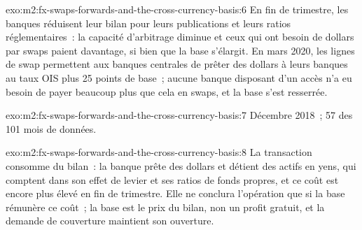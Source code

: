\begin{solution}{exo:m2:fx-swaps-forwards-and-the-cross-currency-basis:6}
En fin de trimestre, les banques réduisent leur bilan pour leurs publications et
leurs ratios réglementaires~: la capacité d'arbitrage diminue et ceux qui ont besoin
de dollars par swaps paient davantage, si bien que la base s'élargit. En mars 2020, les lignes de swap permettent aux banques centrales
de prêter des dollars à leurs banques au taux OIS plus 25 points de base~; aucune banque disposant
d'un accès n'a eu besoin de payer beaucoup plus que cela en swaps, et la base s'est resserrée.
\end{solution}

\begin{solution}{exo:m2:fx-swaps-forwards-and-the-cross-currency-basis:7}
Décembre 2018~; 57 des 101 mois de données.
\end{solution}

\begin{solution}{exo:m2:fx-swaps-forwards-and-the-cross-currency-basis:8}
La transaction consomme du bilan~: la banque prête des dollars et détient des actifs
en yens, qui comptent dans son effet de levier et ses ratios de fonds propres, et ce coût est encore plus élevé en fin de trimestre.
Elle ne conclura l'opération que si la base rémunère ce coût~; la base est le prix du
bilan, non un profit gratuit, et la demande de couverture maintient son ouverture.
\end{solution}

